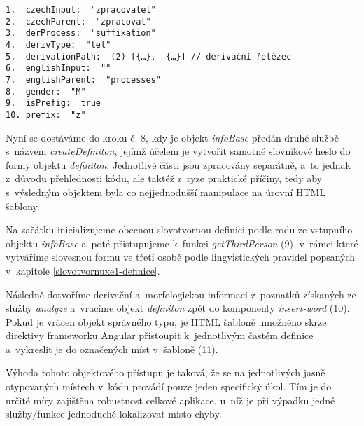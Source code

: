 \begin{verbatim}
1.  czechInput:  "zpracovatel"
2.  czechParent:  "zpracovat"
3.  derProcess:  "suffixation"
4.  derivType:  "tel"
5.  derivationPath:  (2) [{…},  {…}] // derivační řetězec
6.  englishInput:  ""
7.  englishParent:  "processes"
8.  gender:  "M"
9.  isPrefig:  true
10. prefix:  "z"
\end{verbatim}

Nyní se dostáváme do kroku č. 8, kdy je objekt \emph{infoBase} předán
druhé službě s~názvem \emph{createDefiniton}, jejímž účelem je vytvořit
samotné slovníkové heslo do formy objektu \emph{definiton}. Jednotlivé
části jsou zpracovány separátně, a~to jednak z~důvodu přehlednosti kódu,
ale taktéž z~ryze praktické příčiny, tedy aby s~výsledným objektem byla
co nejjednodušší manipulace na úrovní HTML šablony.

Na začátku inicializujeme obecnou slovotvornou definici podle rodu ze
vstupního objektu \emph{infoBase} a~poté přistupujeme k~funkci
\emph{getThirdPerson} (9), v~rámci které vytváříme slovesnou formu ve
třetí osobě podle lingvistických pravidel popsaných v~kapitole
\ref{slovotvornuxe1-definice}.

Následně dotvoříme derivační a~morfologickou informaci z~poznatků
získaných ze služby \emph{analyze} a~vracíme objekt \emph{definiton}
zpět do komponenty \emph{insert-word} (10). Pokud je vrácen objekt
správného typu, je HTML šabloně umožněno skrze direktivy frameworku
Angular přistoupit k~jednotlivým častém definice a~vykreslit je do
označených míst v~šabloně (11).

Výhoda tohoto objektového přístupu je taková, že se na jednotlivých
jasně otypovaných místech v~kódu provádí pouze jeden specifický úkol.
Tím je do určité míry zajištěna robustnost celkové aplikace, u~níž je
při výpadku jedné služby/funkce jednoduché lokalizovat místo chyby.
